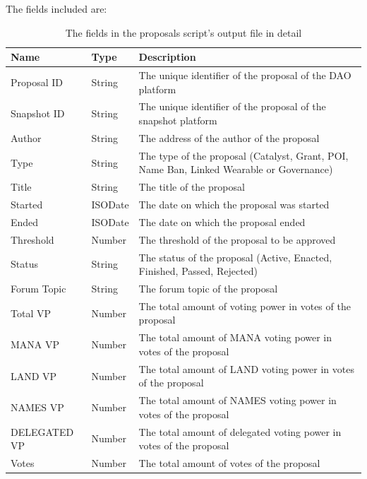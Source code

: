 \documentclass[MSE,Master,english]{twbook}%
\begin{document}
The fields included are:
\begin{table}[H]
  \centering
  \begin{tabularx}{\textwidth}{|l|l|X|}
  \hline
  \textbf{Name} & \textbf{Type} & \textbf{Description}                                                             \\ \hline
  Proposal ID   & String        & The unique identifier of the proposal of the DAO platform                        \\ \hline
  Snapshot ID  & String & The unique identifier of the proposal of the snapshot platform                           \\ \hline
  Author        & String        & The address of the author of the proposal                                        \\ \hline
  Type         & String & The type of the proposal (Catalyst, Grant, POI, Name Ban, Linked Wearable or Governance) \\ \hline
  Title         & String        & The title of the proposal                                                        \\ \hline
  Started       & ISODate       & The date on which the proposal was started                                       \\ \hline
  Ended         & ISODate       & The date on which the proposal ended                                             \\ \hline
  Threshold     & Number        & The threshold of the proposal to be approved                                     \\ \hline
  Status       & String & The status of the proposal (Active, Enacted, Finished, Passed, Rejected)                 \\ \hline
  Forum Topic   & String        & The forum topic of the proposal                                                  \\ \hline
  Total VP      & Number        & The total amount of voting power in votes of the proposal                        \\ \hline
  MANA VP       & Number        & The total amount of MANA voting power in votes of the proposal                   \\ \hline
  LAND VP       & Number        & The total amount of LAND voting power in votes of the proposal                   \\ \hline
  NAMES VP      & Number        & The total amount of NAMES voting power in votes of the proposal                  \\ \hline
  DELEGATED VP & Number & The total amount of delegated voting power in votes of the proposal                      \\ \hline
  Votes         & Number        & The total amount of votes of the proposal                                        \\ \hline
  \end{tabularx}
  \caption{The fields in the proposals script's output file in detail}
  \label{table:proposals}
\end{table}
\end{document}
